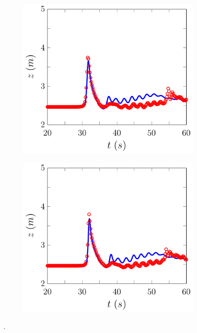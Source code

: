 \begin{figure}
\begin{subfigure}{0.5\textwidth}
		\vspace{0.5cm}
	\end{subfigure}
	\begin{subfigure}{0.5\textwidth}
		\includegraphics[width=\textwidth]{./chp6/figures/Experiment/Roeber/Trial8/FEVM/WG5-figure0.pdf}
		\vspace{0.5cm}
	\end{subfigure}%
	\begin{subfigure}{0.5\textwidth}
		\includegraphics[width=\textwidth]{./chp6/figures/Experiment/Roeber/Trial8/FEVM/WG6-figure0.pdf}
		\vspace{0.5cm}
	\end{subfigure}
	\caption{.}
	\label{fig:Roeber8WG1to6FEVM}
\end{figure}

